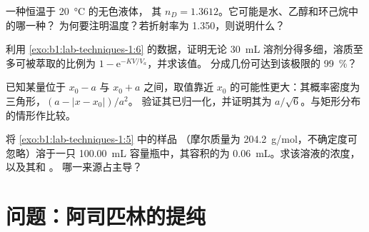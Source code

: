 \begin{exercise}[$\star\star$]\label{exo:b1:lab-techniques-1:9}
一种恒温于 \qty{20}{\celsius} 的无色液体，
其 $n_D = 1.3612$。它可能是水、乙醇和环己烷中的哪一种？
为何要注明温度？若折射率为 1.350，则说明什么？
\end{exercise}

\begin{exercise}[$\star\star\star$]\label{exo:b1:lab-techniques-1:10}
利用 \cref{exo:b1:lab-techniques-1:6} 的数据，证明无论
\qty{30}{mL} 溶剂分得多细，溶质至多可被萃取的比例为
$1 - \mathrm{e}^{-KV/V_a}$，并求该值。
分成几份可达到该极限的 \qty{99}{\percent}？
\end{exercise}

\begin{exercise}[$\star\star\star$]\label{exo:b1:lab-techniques-1:11}
已知某量位于 $x_0 - a$ 与 $x_0 + a$ 之间，取值靠近
$x_0$ 的可能性更大：其概率密度为三角形，$(a - |x - x_0|)/a^2$。
验证其已归一化，并证明其为
$a/\sqrt6$。与矩形分布的情形作比较。
\end{exercise}

\begin{exercise}[$\star\star\star$]\label{exo:b1:lab-techniques-1:12}
将 \cref{exo:b1:lab-techniques-1:5} 中的样品
（摩尔质量为 \qty{204.2}{g/mol}，不确定度可忽略）溶于一只
\qty{100.00}{mL} 容量瓶中，其容积的为
\qty{0.06}{mL}。求该溶液的浓度，以及其和
。
哪一来源占主导？
\end{exercise}

\section{问题：阿司匹林的提纯}

